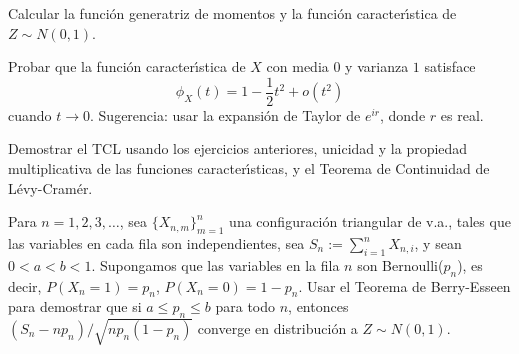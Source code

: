 
\begin{problem}[6]Calcular la funci\'on generatriz de momentos y la funci\'on caracter\'{\i}stica de $Z\sim N(0,1)$. 
 
\solution

\begin{expla}

\end{expla}

\end{problem}


\begin{problem}[7]Probar que la funci\'on caracter\'{\i}stica de $X$ con media 0 y varianza $1$
satisface
$$
\phi_X(t) = 1 - \frac{1}{2} t^2   + o(t^2)
$$ 
cuando $t\to 0$. Sugerencia: usar la expansi\'on de Taylor de $e^{ir}$, donde $r$ es real.
\solution

\begin{expla}

\end{expla}

\end{problem}


\begin{problem}[8] Demostrar el TCL usando los ejercicios anteriores, unicidad y la propiedad multiplicativa de las funciones
caracter\'{\i}sticas, y el Teorema de Continuidad de L\'evy-Cram\'er.
\solution

\begin{expla}

\end{expla}

\end{problem}


\begin{problem}[9]Para $n=1, 2, 3, \dots$, sea  $\{X_{n,m}\}_{m=1}^{n}$  una configuraci\'on triangular de v.a., tales que las variables en cada fila son independientes, sea $S_{n} := \sum_{i=1}^n X_{n,i}$, y sean $0 < a < b < 1$. Supongamos que las
variables en la fila $n$ son Bernoulli($p_n$), es decir, $P(X_n = 1) = p_n$, $P(X_n = 0) = 1 - p_n$.
Usar el Teorema de Berry-Esseen para demostrar que si $a \le p_n \le b$ para todo $n$,
entonces $(S_n - n p_n)/\sqrt{n p_n (1 - p_n)}$ converge en distribuci\'on a $Z\sim N(0,1)$.
\solution

\begin{expla}

\end{expla}

\end{problem}

